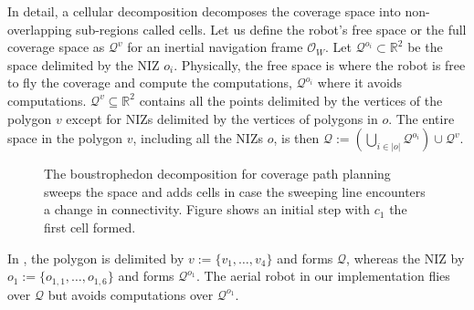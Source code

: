 In detail, a cellular decomposition decomposes the coverage space into non-overlapping sub-regions called cells. Let us define the robot's free space or the full coverage space as $\mathcal{Q}^v$ for an inertial navigation frame $\mathcal{O}_W$. Let $\mathcal{Q}^{o_i}\subset\mathbb{R}^2$ be the space delimited by the NIZ $o_i$. Physically, the free space is where the robot is free to fly the coverage and compute the computations, $\mathcal{Q}^{o_i}$ where it avoids computations. $\mathcal{Q}^v\subseteq\mathbb{R}^2$ contains all the points delimited by the vertices of the polygon $v$ except for NIZs delimited by the vertices of polygons in $o$. The entire space in the polygon $v$, including all the NIZs $o$, is then $\mathcal{Q}:=(\bigcup_{i\in|o|}\mathcal{Q}^{o_i})\cup\mathcal{Q}^v$. 
\begin{figure}[h]
  \centering
  \selectfont
  
  \caption[Initial step of the boustrophedon decomposition]{The boustrophedon decomposition for coverage path planning sweeps the space and adds cells in case the sweeping line encounters a change in connectivity. Figure shows an initial step with $c_1$ the first cell formed.}
  \label{fig:bcd2}
\end{figure}
In , the polygon is delimited by $v:=\{v_1,\dots,v_4\}$ and forms $\mathcal{Q}$, whereas the NIZ by $o_1:=\{o_{1,1},\dots,o_{1,6}\}$ and forms $\mathcal{Q}^{o_1}$. The aerial robot in our implementation flies over $\mathcal{Q}$ but avoids computations over $\mathcal{Q}^{o_1}$.

